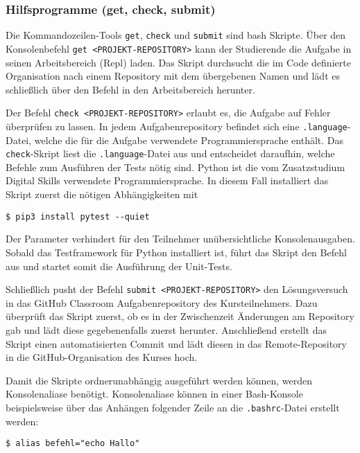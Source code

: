 \subsubsection{Hilfsprogramme (get, check, submit)}
\label{replit-template-wrapper-tools}
Die Kommandozeilen-Tools \texttt{get}, \texttt{check} und \texttt{submit} sind
\ac{bash} Skripte. Über den Konsolenbefehl \texttt{get <PROJEKT-REPOSITORY>}
kann der Studierende die Aufgabe in seinen Arbeitsbereich (Repl) laden. Das
Skript durchsucht die im Code definierte Organisation nach einem Repository mit
dem übergebenen Namen und lädt es schließlich über den Befehl 
in den Arbeitsbereich herunter.

Der Befehl \texttt{check <PROJEKT-REPOSITORY>} erlaubt es, die Aufgabe auf
Fehler überprüfen zu lassen. In jedem Aufgabenrepository befindet sich eine
\texttt{.language}-Datei, welche die für die Aufgabe verwendete
Programmiersprache enthält. Das \texttt{check}-Skript liest die
\texttt{.language}-Datei aus und entscheidet daraufhin, welche Befehle zum
Ausführen der Tests nötig sind. Python ist die vom Zusatzstudium Digital Skills
verwendete Programmiersprache. In diesem Fall installiert das Skript zuerst die
nötigen Abhängigkeiten mit

\begin{lstlisting}[style=Bash]
$ pip3 install pytest --quiet
\end{lstlisting}

Der Parameter  verhindert für den Teilnehmer unübersichtliche
Konsolenausgaben. Sobald das Testframework für Python installiert ist, führt das
Skript den Befehl  aus und startet somit die Ausführung der
Unit-Tests.

Schließlich pusht der Befehl \texttt{submit <PROJEKT-REPOSITORY>}
den Lösungsversuch in das GitHub Classroom Aufgabenrepository des
Kursteilnehmers. Dazu überprüft das Skript zuerst, ob es in der Zwischenzeit
Änderungen am Repository gab und lädt diese gegebenenfalls zuerst herunter.
Anschließend erstellt das Skript einen automatisierten Commit und lädt diesen
in das Remote-Repository in die GitHub-Organisation des Kurses hoch.

Damit die Skripte ordnerunabhängig ausgeführt werden können, werden
Konsolenaliase benötigt. Konsolenaliase können in einer Bash-Konsole
beispielsweise über das Anhängen folgender Zeile an die \texttt{.bashrc}-Datei
erstellt werden:

\begin{lstlisting}[style=Bash]
$ alias befehl="echo Hallo"
\end{lstlisting}

